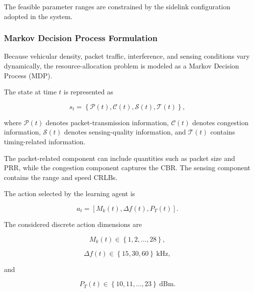 The feasible parameter ranges are constrained by the sidelink
configuration adopted in the system.

\subsubsection{Markov Decision Process Formulation}

Because vehicular density, packet traffic, interference, and sensing
conditions vary dynamically, the resource-allocation problem is modeled as
a Markov Decision Process (MDP).

The state at time $t$ is represented as

\begin{equation}
s_t
=
\left\{
\mathcal{P}(t),
\mathcal{C}(t),
\mathcal{S}(t),
\mathcal{T}(t)
\right\},
\label{eq:isac_mdp_state}
\end{equation}

where $\mathcal{P}(t)$ denotes packet-transmission information,
$\mathcal{C}(t)$ denotes congestion information,
$\mathcal{S}(t)$ denotes sensing-quality information, and
$\mathcal{T}(t)$ contains timing-related information.

The packet-related component can include quantities such as packet size and
PRR, while the congestion component captures the CBR. The sensing component
contains the range and speed CRLBs.

The action selected by the learning agent is

\begin{equation}
a_t
=
\left[
M_k(t),
\Delta f(t),
P_T(t)
\right].
\label{eq:isac_mdp_action}
\end{equation}

The considered discrete action dimensions are

\begin{equation}
M_k(t)
\in
\left\{
1,2,\ldots,28
\right\},
\label{eq:isac_action_mcs}
\end{equation}

\begin{equation}
\Delta f(t)
\in
\left\{
15,30,60
\right\}
\ \mathrm{kHz},
\label{eq:isac_action_scs}
\end{equation}

and

\begin{equation}
P_T(t)
\in
\left\{
10,11,\ldots,23
\right\}
\ \mathrm{dBm}.
\label{eq:isac_action_power}
\end{equation}

